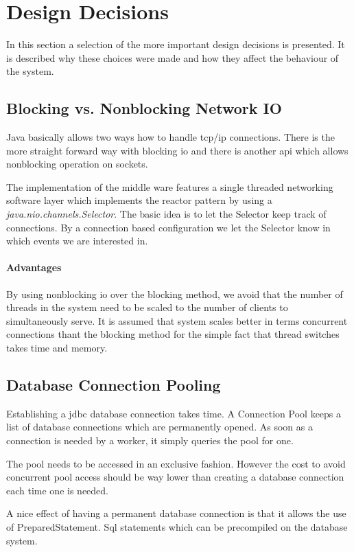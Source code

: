 \documentclass[milestone1.tex]{subfiles}
\begin{document}
\section{Design Decisions}

In this section a selection of the more important design decisions is presented. It is described why these choices were made and how they affect the behaviour of the system.

\subsection{Blocking vs. Nonblocking Network IO}
Java basically allows two ways how to handle tcp/ip connections. There is the more straight forward way with blocking io and there is another api which allows nonblocking operation on sockets.

The implementation of the middle ware features a single threaded networking software layer which implements the reactor pattern by using a \textit{java.nio.channels.Selector}. The basic idea is to let the Selector keep track of connections. By a connection based configuration we let the Selector know in which events we are interested in.

\paragraph{Advantages}
By using nonblocking io over the blocking method, we avoid that the number of threads in the system need to be scaled to the number of clients to simultaneously serve. It is assumed that system scales better in terms concurrent connections thant the blocking method for the simple fact that thread switches takes time and memory.

\subsection{Database Connection Pooling}
Establishing a jdbc database connection takes time. A Connection Pool keeps a list of database connections which are permanently opened. As soon as a connection is needed by a worker, it simply queries the pool for one.

The pool needs to be accessed in an exclusive fashion. However the cost to avoid concurrent pool access should be way lower than creating a database connection each time one is needed.

A nice effect of having a permanent database connection is that it allows the use of PreparedStatement. Sql statements which can be precompiled on the database system.
\end{document}
